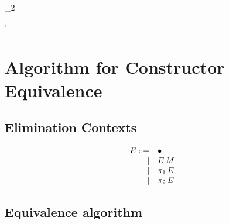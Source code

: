 \documentclass{article}
\theoremstyle{break}
\begin{document}
\infrule
  {\validconstructor{\context}{\constructor}
     {}}
  {\equivconstructor{\context}
     {\cfunction{\cvar}{\kind}{(\capply{\constructor}{\cvar})}}
     {\constructor}{}}

\infrule
  {\validconstructor{\context}
     {}
     {}\qquad
   }
  {\equivconstructor{\context}
     {
             {\constructor_2}}
     {}
     {}}

\infrule
  {
     {}}
  {\equivconstructor{\context}
     {}
     {\constructor}{\kind}}

\infrule
  {
     {}}
  {\equivconstructor{\context}
     {}
     {\constructor'}{}}

\infrule
  {
   \qquad
   }
  {}

\section{Algorithm for Constructor Equivalence}

\subsection{Elimination Contexts}

\newcommand{\hole}{\bullet}

\[
\begin{array}{rll}
E ::= &\hole\\
    |&\capply{E}{\constructor}\\
    |&\cpi{1}{E}\\
    |&\cpi{2}{E}\\
\end{array}
\]

\subsection{Equivalence algorithm}
\end{document}
